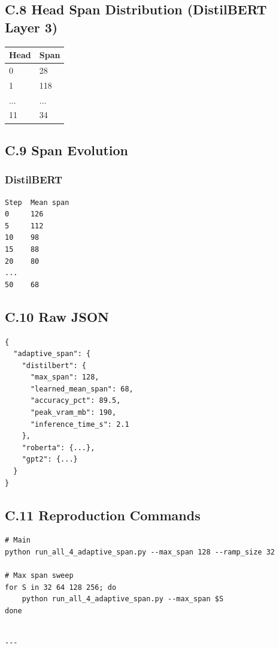 \subsection{C.8 Head Span Distribution (DistilBERT Layer 3)}

\begin{table}[H]
\centering
\small
\begin{tabular}{ll}
\toprule
\textbf{Head} & \textbf{Span} \\
\midrule
0 & 28 \\
1 & 118 \\
... & ... \\
11 & 34 \\
\bottomrule
\end{tabular}
\end{table}

\subsection{C.9 Span Evolution}

\subsubsection{DistilBERT}
\begin{lstlisting}
Step  Mean span
0     126
5     112
10    98
15    88
20    80
...
50    68
\end{lstlisting}

\subsection{C.10 Raw JSON}

\begin{lstlisting}
{
  "adaptive_span": {
    "distilbert": {
      "max_span": 128,
      "learned_mean_span": 68,
      "accuracy_pct": 89.5,
      "peak_vram_mb": 190,
      "inference_time_s": 2.1
    },
    "roberta": {...},
    "gpt2": {...}
  }
}
\end{lstlisting}

\subsection{C.11 Reproduction Commands}

\begin{lstlisting}
# Main
python run_all_4_adaptive_span.py --max_span 128 --ramp_size 32

# Max span sweep
for S in 32 64 128 256; do
    python run_all_4_adaptive_span.py --max_span $S
done
\end{lstlisting}
\begin{lstlisting}

---
\end{lstlisting}


